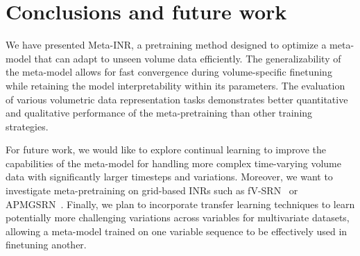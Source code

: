 \vspace{-0.075in}
\section{Conclusions and future work}
\vspace{-0.025in}

We have presented Meta-INR, a pretraining method designed to optimize a meta-model that can adapt to unseen volume data efficiently.
%
The generalizability of the meta-model allows for fast convergence during volume-specific finetuning while retaining the model interpretability within its parameters. 
The evaluation of various volumetric data representation tasks demonstrates better quantitative and qualitative performance of the meta-pretraining than other training strategies.  

For future work, we would like to explore continual learning to improve the capabilities of the meta-model for handling more complex time-varying volume data with significantly larger timesteps and variations.
Moreover, we want to investigate meta-pretraining on grid-based INRs such as fV-SRN~\cite{Weiss-CGF22} or APMGSRN~\cite{Wurster-TVCG24}.
Finally, we plan to incorporate transfer learning techniques to learn potentially more challenging variations across variables for multivariate datasets, allowing a meta-model trained on one variable sequence to be effectively used in finetuning another.
